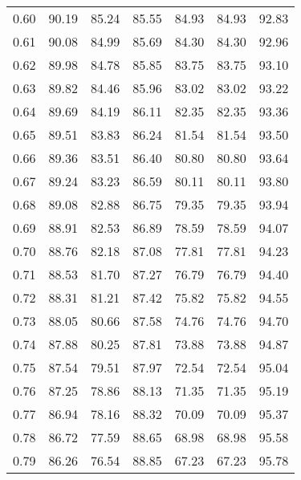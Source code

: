 \begin{tabular}{|c|c|c|c|c|c|c|}
      0.60 &     90.19 &     85.24 &      85.55 &   84.93 &      84.93 &         92.83 \\
      0.61 &     90.08 &     84.99 &      85.69 &   84.30 &      84.30 &         92.96 \\
      0.62 &     89.98 &     84.78 &      85.85 &   83.75 &      83.75 &         93.10 \\
      0.63 &     89.82 &     84.46 &      85.96 &   83.02 &      83.02 &         93.22 \\
      0.64 &     89.69 &     84.19 &      86.11 &   82.35 &      82.35 &         93.36 \\
      0.65 &     89.51 &     83.83 &      86.24 &   81.54 &      81.54 &         93.50 \\
      0.66 &     89.36 &     83.51 &      86.40 &   80.80 &      80.80 &         93.64 \\
      0.67 &     89.24 &     83.23 &      86.59 &   80.11 &      80.11 &         93.80 \\
      0.68 &     89.08 &     82.88 &      86.75 &   79.35 &      79.35 &         93.94 \\
      0.69 &     88.91 &     82.53 &      86.89 &   78.59 &      78.59 &         94.07 \\
      0.70 &     88.76 &     82.18 &      87.08 &   77.81 &      77.81 &         94.23 \\
      0.71 &     88.53 &     81.70 &      87.27 &   76.79 &      76.79 &         94.40 \\
      0.72 &     88.31 &     81.21 &      87.42 &   75.82 &      75.82 &         94.55 \\
      0.73 &     88.05 &     80.66 &      87.58 &   74.76 &      74.76 &         94.70 \\
      0.74 &     87.88 &     80.25 &      87.81 &   73.88 &      73.88 &         94.87 \\
      0.75 &     87.54 &     79.51 &      87.97 &   72.54 &      72.54 &         95.04 \\
      0.76 &     87.25 &     78.86 &      88.13 &   71.35 &      71.35 &         95.19 \\
      0.77 &     86.94 &     78.16 &      88.32 &   70.09 &      70.09 &         95.37 \\
      0.78 &     86.72 &     77.59 &      88.65 &   68.98 &      68.98 &         95.58 \\
      0.79 &     86.26 &     76.54 &      88.85 &   67.23 &      67.23 &         95.78 \\

\end{tabular}
